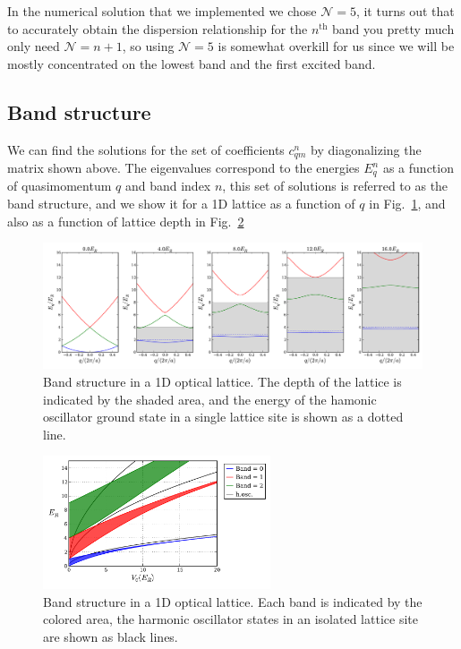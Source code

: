 \documentclass[11pt,letter]{article}
\begin{document}
In the numerical solution that  we implemented we chose $\mathcal{N}=5$,  it
turns out that to accurately obtain the dispersion relationship for the
$n^\mathrm{th}$ band you pretty much only need $\mathcal{N}=n+1$, so using
$\mathcal{N}=5$ is somewhat overkill for us since we will be mostly
concentrated on the lowest band and the first excited band.  

\subsection{Band structure}

We can find the solutions for the set of coefficients $c_{qm}^{n}$ by
diagonalizing the matrix shown above.  The eigenvalues correspond to the
energies $E_{q}^{n}$ as a function of quasimomentum $q$ and band index $n$,
this set of solutions is referred to as the band structure, and we show it for
a 1D lattice as a function of $q$ in Fig.~\ref{fig:bands1d}, and also as a
function of lattice depth in Fig.~\ref{fig:bands1d_V0} 
\begin{figure}
\centering \includegraphics[width=\textwidth]{../BandStructure_figures/bands1d.pdf}
\caption[Band structure in 1D lattice.]{\small Band structure in a 1D optical
lattice.  The depth of the lattice is indicated by the shaded area, and the
energy of the hamonic oscillator ground state in a single lattice site is shown
as a dotted line.  } \label{fig:bands1d}
\end{figure}
\begin{figure}
\centering \includegraphics[width=0.6\textwidth]{../BandStructure_figures/bands1d_V0.pdf}
\caption[Band structure in 1D lattice.]{\small Band structure in a 1D optical
lattice.  Each band is indicated by the colored area,  the harmonic oscillator
states in an isolated lattice site are shown as black lines. }
\label{fig:bands1d_V0}
\end{figure}
\end{document}
